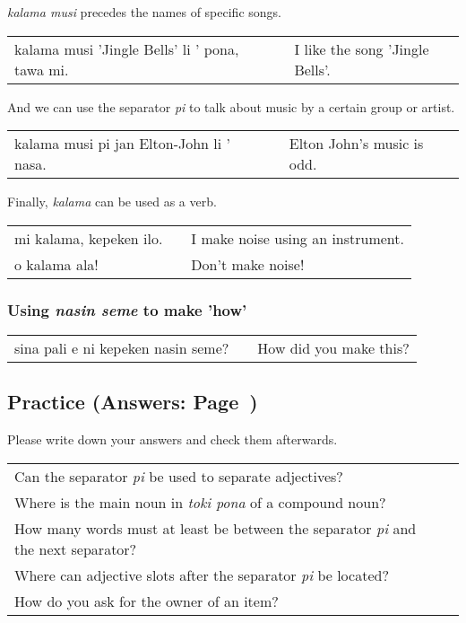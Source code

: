 \textit{kalama musi} precedes the names of specific songs. 

\begin{supertabular}{p{5,5cm}|ll}
kalama musi 'Jingle Bells' li ' pona, tawa mi. && I like the song 'Jingle Bells'. \\
\end{supertabular}  

And we can use the separator \textit{pi} to talk about music by a certain group or artist. 

\begin{supertabular}{p{5,5cm}|ll}
kalama musi pi jan Elton-John li ' nasa. && Elton John's music is odd. \\
\end{supertabular}  

Finally, \textit{kalama} can be used as a verb.

\begin{supertabular}{p{5,5cm}|ll}
mi kalama, kepeken ilo. && I make noise using an instrument. \\
o kalama ala! && Don't make noise! \\
\end{supertabular}  
%
\subsubsection*{Using \textit{nasin seme} to make 'how'}
%
%
\begin{supertabular}{p{5,5cm}|ll}
sina pali e ni kepeken nasin seme? && How did you make this? \\
\end{supertabular}  
%
%
\newpage
%
\subsection*{Practice (Answers: Page~\pageref{'pi'})}
%
Please write down your answers and check them afterwards. 

\begin{supertabular}{p{5,5cm}|ll}
Can the separator \textit{pi} be used to separate adjectives? &&  \\ %
Where is the main noun in \textit{toki pona} of a compound noun? && \\ %
How many words must at least be between the separator \textit{pi} and the next separator? &&  \\ %
Where can adjective slots after the separator \textit{pi} be located? &&  \\ %
How do you ask for the owner of an item? &&  \\ %
\end{supertabular}

